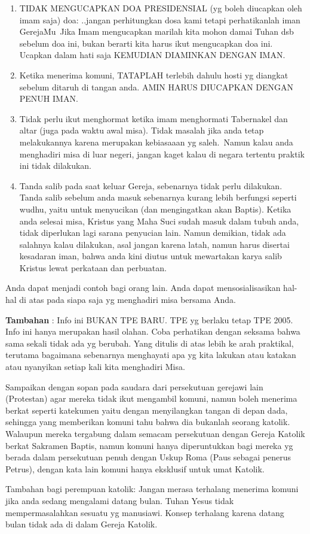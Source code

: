 \begin{enumerate}
\item TIDAK MENGUCAPKAN DOA PRESIDENSIAL (yg boleh diucapkan oleh imam
saja) doa: {\textquotedbl}..jangan perhitungkan dosa kami tetapi
perhatikanlah iman GerejaMu{\textquotedbl}~Jika Imam mengucapkan
{\textquotedbl}marilah kita mohon damai Tuhan{\textquotedbl} dsb
sebelum doa ini, bukan berarti kita harus ikut mengucapkan doa ini.
Ucapkan dalam hati saja KEMUDIAN DIAMINKAN DENGAN IMAN.~  
\item Ketika menerima komuni, TATAPLAH terlebih dahulu hosti yg diangkat sebelum
ditaruh di tangan anda. AMIN HARUS DIUCAPKAN DENGAN PENUH IMAN.~  
\item Tidak perlu ikut menghormat ketika imam menghormati Tabernakel dan
altar (juga pada waktu awal misa). Tidak masalah jika anda tetap
melakukannya karena merupakan kebiasaaan yg saleh.~Namun kalau anda
menghadiri misa di luar negeri, jangan kaget kalau di negara tertentu
praktik ini tidak dilakukan.~  
\item Tanda salib pada saat keluar Gereja,
sebenarnya tidak perlu dilakukan. Tanda salib sebelum anda masuk
sebenarnya kurang lebih berfungsi seperti wudhu, yaitu untuk menyucikan
(dan mengingatkan akan Baptis). Ketika anda selesai misa, Kristus yang
Maha Suci sudah masuk dalam tubuh anda, tidak diperlukan lagi sarana
penyucian lain. Namun demikian, tidak ada salahnya kalau dilakukan,
asal jangan karena latah, namun harus disertai kesadaran iman, bahwa anda
kini diutus untuk mewartakan karya salib Kristus lewat perkataan dan
perbuatan.~  
\end{enumerate}


Anda dapat menjadi contoh bagi orang lain. Anda dapat mensosialisasikan hal-hal di atas pada siapa saja yg menghadiri misa bersama Anda.

\textbf{Tambahan} : Info ini BUKAN TPE BARU. TPE yg berlaku
tetap TPE 2005. Info ini hanya merupakan hasil olahan. Coba perhatikan
dengan seksama bahwa sama sekali tidak ada yg berubah. Yang ditulis di
atas lebih ke arah praktikal, terutama bagaimana sebenarnya menghayati
apa yg kita lakukan atau katakan atau nyanyikan setiap kali kita
menghadiri Misa.~  

Sampaikan dengan sopan pada saudara dari persekutuan
gerejawi lain (Protestan) agar mereka tidak ikut mengambil komuni,
namun boleh menerima berkat seperti katekumen yaitu dengan menyilangkan
tangan di depan dada, sehingga yang memberikan komuni tahu bahwa dia
bukanlah seorang katolik. Walaupun mereka tergabung dalam semacam
persekutuan dengan Gereja Katolik berkat Sakramen Baptis, namun komuni
hanya diperuntukkan bagi mereka yg berada dalam persekutuan penuh
dengan Uskup Roma (Paus sebagai penerus Petrus), dengan kata lain
komuni hanya eksklusif untuk umat Katolik.~  

Tambahan bagi perempuan
katolik: Jangan merasa terhalang menerima komuni jika anda sedang
mengalami datang bulan. Tuhan Yesus tidak mempermasalahkan sesuatu yg
manusiawi. Konsep terhalang karena datang bulan tidak ada di dalam Gereja Katolik.
